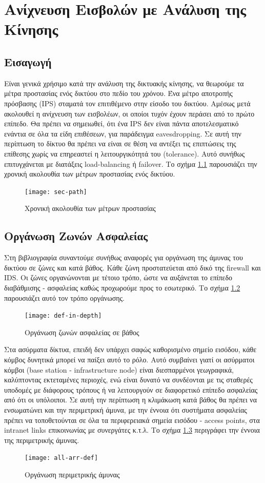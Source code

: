 \documentclass[12pt]{report}
\begin{document}
\chapter{Ανίχνευση Εισβολών με Ανάλυση της Κίνησης}
\section{Εισαγωγή}
Είναι γενικά χρήσιμο κατά την ανάλυση της δικτυακής κίνησης, να θεωρούμε τα μέτρα προστασίας ενός δικτύου στο πεδίο του χρόνου. Ένα μέτρο αποτροπής πρόσβασης (\textlatin{IPS}) σταματά τον επιτιθέμενο στην είσοδο του δικτύου. Αμέσως μετά ακολουθεί η ανίχνευση των εισβολέων, οι οποίοι τυχόν έχουν περάσει από το πρώτο επίπεδο. Θα πρέπει να σημειωθεί, ότι ένα \textlatin{IPS} δεν είναι πάντα αποτελεσματικό ενάντια σε όλα τα είδη επιθέσεων, για παράδειγμα \textlatin{eavesdropping}. Σε αυτή την περίπτωση το δίκτυο θα πρέπει να είναι σε θέση να αντέξει τις επιπτώσεις της επίθεσης χωρίς να επηρεαστεί η λειτουργικότητά του (\textlatin{tolerance}). Αυτό συνήθως επιτυγχάνεται με διατάξεις \textlatin{load-balancing} ή \textlatin{failover}. Το σχήμα \ref{fig:sec-path} παρουσιάζει την χρονική ακολουθία των μέτρων προστασίας ενός δικτύου.
\begin{figure}[ht]
\centering
\texttt{[image: sec-path]}
\caption{Χρονική ακολουθία των μέτρων προστασίας}
\label{fig:sec-path}
\end{figure}

\section{Οργάνωση Ζωνών Ασφαλείας}
Στη βιβλιογραφία συναντούμε συνήθως αναφορές για οργάνωση της άμυνας του δικτύου σε ζώνες και κατά βάθος. Κάθε ζώνη προστατεύεται από δικό της \textlatin{firewall} και \textlatin{IDS}. Οι ζώνες οργανώνονται με τέτοιο τρόπο, ώστε να αυξάνεται το επίπεδο διαβάθμισης - ασφαλείας καθώς προχωρούμε προς το εσωτερικό. Το σχήμα \ref{fig:def-in-depth} παρουσιάζει αυτό τον τρόπο οργάνωσης.
\begin{figure}[ht]
\centering
\texttt{[image: def-in-depth]}
\caption{Οργάνωση ζωνών ασφαλείας σε βάθος}
\label{fig:def-in-depth}
\end{figure}

Στα ασύρματα δίκτυα, επειδή δεν υπάρχει σαφώς καθορισμένο σημείο εισόδου, κάθε κόμβος δυνητικά μπορεί να παίξει αυτό το ρόλο. Αυτό συμβαίνει γιατί οι ασύρματοι κόμβοι (\textlatin{base station - infrastructure node}) είναι διεσπαρμένοι γεωγραφικά, καλύπτοντας εκτεταμένες περιοχές, ενώ είναι δυνατό να συνδέονται με τις σταθερές υποδομές με διάφορους τρόπους ή να λειτουργούν σε διαφορετικό επίπεδο ασφαλείας από ότι οι υπόλοιποι. Σε αυτή την περίπτωση η κλιμάκωση κατά βάθος θα πρέπει να ενσωματώνει και την περιμετρική άμυνα, με την έννοια ότι συστήματα ασφαλείας πρέπει να τοποθετούνται σε όλα τα περιφερειακά σημεία εισόδου - \textlatin{access points}, στα \textlatin{intranet links} επικοινωνίας με συνεργάτες κ.τ.λ. Το σχήμα \ref{fig:all-arr-def} περιγράφει την έννοια της περιμετρικής άμυνας.
\begin{figure}[ht]
\centering
\texttt{[image: all-arr-def]}
\caption{Οργάνωση περιμετρικής άμυνας}
\label{fig:all-arr-def}
\end{figure}
\end{document}
